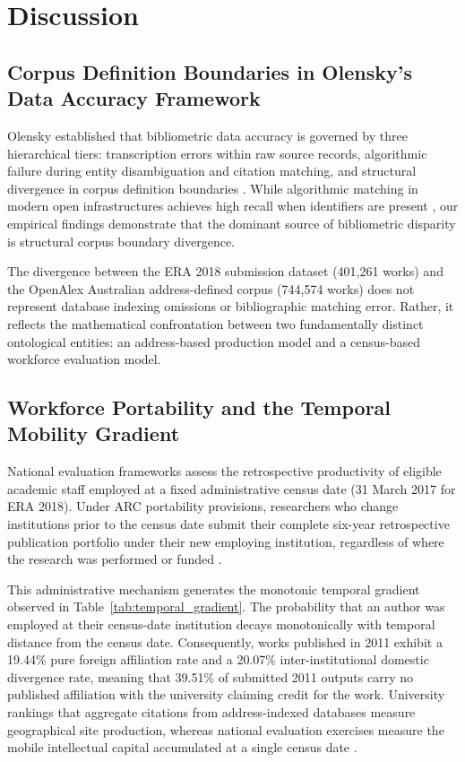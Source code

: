 \section{Discussion}\label{sec:discussion}

\subsection{Corpus Definition Boundaries in Olensky's Data Accuracy Framework}
Olensky established that bibliometric data accuracy is governed by three hierarchical tiers: transcription errors within raw source records, algorithmic failure during entity disambiguation and citation matching, and structural divergence in corpus definition boundaries \cite{olenskyDataAccuracyBibliometric2015,olenskyEvaluationCitationMatching2016}. While algorithmic matching in modern open infrastructures achieves high recall when identifiers are present \cite{priemOpenAlexFullyopenIndex2022}, our empirical findings demonstrate that the dominant source of bibliometric disparity is structural corpus boundary divergence. 

The divergence between the ERA 2018 submission dataset (401,261 works) and the OpenAlex Australian address-defined corpus (744,574 works) does not represent database indexing omissions or bibliographic matching error. Rather, it reflects the mathematical confrontation between two fundamentally distinct ontological entities: an address-based production model and a census-based workforce evaluation model.

\subsection{Workforce Portability and the Temporal Mobility Gradient}
National evaluation frameworks assess the retrospective productivity of eligible academic staff employed at a fixed administrative census date (31 March 2017 for ERA 2018). Under ARC portability provisions, researchers who change institutions prior to the census date submit their complete six-year retrospective publication portfolio under their new employing institution, regardless of where the research was performed or funded \cite{mowBlackBoxResearch2010}.

This administrative mechanism generates the monotonic temporal gradient observed in Table~\ref{tab:temporal_gradient}. The probability that an author was employed at their census-date institution decays monotonically with temporal distance from the census date. Consequently, works published in 2011 exhibit a 19.44\% pure foreign affiliation rate and a 20.07\% inter-institutional domestic divergence rate, meaning that 39.51\% of submitted 2011 outputs carry no published affiliation with the university claiming credit for the work. University rankings that aggregate citations from address-indexed databases measure geographical site production, whereas national evaluation exercises measure the mobile intellectual capital accumulated at a single census date \cite{vanraanFatalAttractionConceptual2005}.

